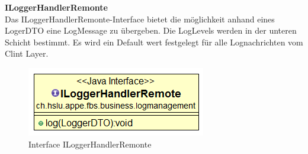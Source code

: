 \textbf{ILoggerHandlerRemonte}\\
Das ILoggerHandlerRemonte-Interface bietet die möglichkeit anhand eines LogerDTO eine LogMessage zu übergeben. Die LogLevels werden in der unteren Schicht bestimmt. Es wird ein Default wert festgelegt für alle Lognachrichten vom Clint Layer.
\begin{figure}[H]
	\includegraphics[width=0.5\linewidth]{Images/ILoggerHandlerRemonte}
	\caption{Interface ILoggerHandlerRemonte}
	\label{fig:if-ILoggerHandler}
\end{figure}


